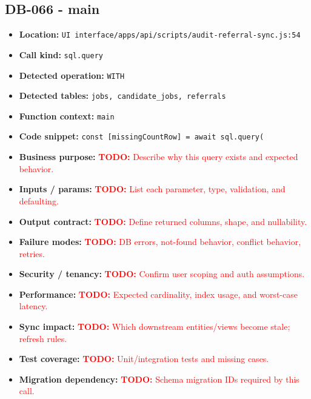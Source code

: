 \documentclass[11pt]{article}
\newcommand{\todoitem}[1]{\textcolor{red}{\textbf{TODO:} #1}}
\begin{document}
\subsection{DB-066 - main}
\begin{itemize}[leftmargin=1.5em]
\item \textbf{Location:} \texttt{UI interface/apps/api/scripts/audit-referral-sync.js:54}
\item \textbf{Call kind:} \texttt{sql.query}
\item \textbf{Detected operation:} \texttt{WITH}
\item \textbf{Detected tables:} \texttt{jobs, candidate\_jobs, referrals}
\item \textbf{Function context:} \texttt{main}
\item \textbf{Code snippet:} \texttt{const [missingCountRow] = await sql.query(}
\item \textbf{Business purpose:} \todoitem{Describe why this query exists and expected behavior.}
\item \textbf{Inputs / params:} \todoitem{List each parameter, type, validation, and defaulting.}
\item \textbf{Output contract:} \todoitem{Define returned columns, shape, and nullability.}
\item \textbf{Failure modes:} \todoitem{DB errors, not-found behavior, conflict behavior, retries.}
\item \textbf{Security / tenancy:} \todoitem{Confirm user scoping and auth assumptions.}
\item \textbf{Performance:} \todoitem{Expected cardinality, index usage, and worst-case latency.}
\item \textbf{Sync impact:} \todoitem{Which downstream entities/views become stale; refresh rules.}
\item \textbf{Test coverage:} \todoitem{Unit/integration tests and missing cases.}
\item \textbf{Migration dependency:} \todoitem{Schema migration IDs required by this call.}
\end{itemize}
\end{document}
